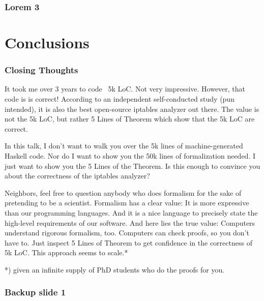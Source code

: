 \documentclass[aspectratio=169]{beamer}
\begin{document}
\begin{frame}
	\frametitle{Lorem 3}
	\blindtext
\end{frame}



\section{Conclusions}

\begin{frame}
	\frametitle{Closing Thoughts}
	It took me over 3 years to code ~5k LoC. Not very impressive. However, that code is is correct! According to an independent self-conducted study (pun intended), it is also the best open-source iptables analyzer out there. The value is not the 5k LoC, but rather 5 Lines of Theorem which show that the 5k LoC are correct.

In this talk, I don’t want to walk you over the 5k lines of machine-generated Haskell code. Nor do I want to show you the 50k lines of formalization needed. I just want to show you the 5 Lines of the Theorem. Is this enough to convince you about the correctness of the iptables analyzer?

Neighbors, feel free to question anybody who does formalism for the sake of pretending to be a scientist. Formalism has a clear value: It is more expressive than our programming languages. And it is a nice language to precisely state the high-level requirements of our software. And here lies the true value: Computers understand rigorous formalism, too. Computers can check proofs, so you don’t have to. Just inspect 5 Lines of Theorem to get confidence in the correctness of 5k LoC. This approach seems to scale.*

*) given an infinite supply of PhD students who do the proofs for you.
\end{frame}



\appendix
\backupbegin
  \begin{frame}
    \frametitle{Backup slide 1}
    \blindtext
  \end{frame}
\backupend
\end{document}

